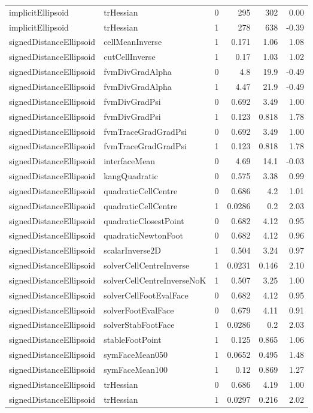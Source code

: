 \begin{tabular}{l l c r r r}
implicitEllipsoid & trHessian & 0 & 295 & 302 & 0.00 \\
implicitEllipsoid & trHessian & 1 & 278 & 638 & -0.39 \\
signedDistanceEllipsoid & cellMeanInverse & 1 & 0.171 & 1.06 & 1.08 \\
signedDistanceEllipsoid & cutCellInverse & 1 & 0.17 & 1.03 & 1.02 \\
signedDistanceEllipsoid & fvmDivGradAlpha & 0 & 4.8 & 19.9 & -0.49 \\
signedDistanceEllipsoid & fvmDivGradAlpha & 1 & 4.47 & 21.9 & -0.49 \\
signedDistanceEllipsoid & fvmDivGradPsi & 0 & 0.692 & 3.49 & 1.00 \\
signedDistanceEllipsoid & fvmDivGradPsi & 1 & 0.123 & 0.818 & 1.78 \\
signedDistanceEllipsoid & fvmTraceGradGradPsi & 0 & 0.692 & 3.49 & 1.00 \\
signedDistanceEllipsoid & fvmTraceGradGradPsi & 1 & 0.123 & 0.818 & 1.78 \\
signedDistanceEllipsoid & interfaceMean & 0 & 4.69 & 14.1 & -0.03 \\
signedDistanceEllipsoid & kangQuadratic & 0 & 0.575 & 3.38 & 0.99 \\
signedDistanceEllipsoid & quadraticCellCentre & 0 & 0.686 & 4.2 & 1.01 \\
signedDistanceEllipsoid & quadraticCellCentre & 1 & 0.0286 & 0.2 & 2.03 \\
signedDistanceEllipsoid & quadraticClosestPoint & 0 & 0.682 & 4.12 & 0.95 \\
signedDistanceEllipsoid & quadraticNewtonFoot & 0 & 0.682 & 4.12 & 0.96 \\
signedDistanceEllipsoid & scalarInverse2D & 1 & 0.504 & 3.24 & 0.97 \\
signedDistanceEllipsoid & solverCellCentreInverse & 1 & 0.0231 & 0.146 & 2.10 \\
signedDistanceEllipsoid & solverCellCentreInverseNoK & 1 & 0.507 & 3.25 & 1.00 \\
signedDistanceEllipsoid & solverCellFootEvalFace & 0 & 0.682 & 4.12 & 0.95 \\
signedDistanceEllipsoid & solverFootEvalFace & 0 & 0.679 & 4.11 & 0.91 \\
signedDistanceEllipsoid & solverStabFootFace & 1 & 0.0286 & 0.2 & 2.03 \\
signedDistanceEllipsoid & stableFootPoint & 1 & 0.125 & 0.865 & 1.06 \\
signedDistanceEllipsoid & symFaceMean050 & 1 & 0.0652 & 0.495 & 1.48 \\
signedDistanceEllipsoid & symFaceMean100 & 1 & 0.12 & 0.869 & 1.27 \\
signedDistanceEllipsoid & trHessian & 0 & 0.686 & 4.19 & 1.00 \\
signedDistanceEllipsoid & trHessian & 1 & 0.0297 & 0.216 & 2.02 \\
\hline
\end{tabular}
